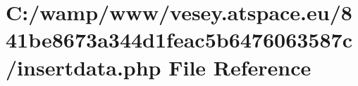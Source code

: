 \hypertarget{841be8673a344d1feac5b6476063587c_2insertdata_8php}{\section{C\-:/wamp/www/vesey.atspace.\-eu/841be8673a344d1feac5b6476063587c/insertdata.php File Reference}
\label{841be8673a344d1feac5b6476063587c_2insertdata_8php}
}
